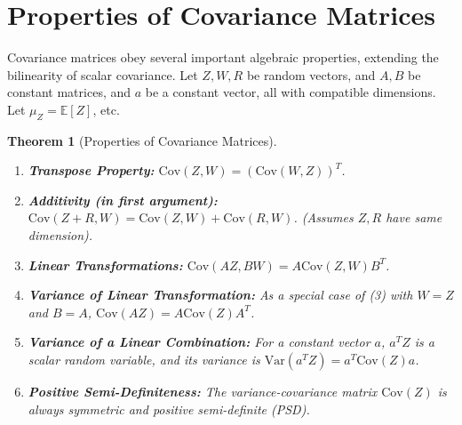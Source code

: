 \documentclass[11pt]{article}
\newtheorem{theorem}{Theorem}[section]
\theoremstyle{definition}
\newcommand{\E}{\mathbb{E}}
\newcommand{\Cov}{\mathrm{Cov}}
\newcommand{\Var}{\mathrm{Var}}
\begin{document}
\section{Properties of Covariance Matrices}

Covariance matrices obey several important algebraic properties, extending the bilinearity of scalar covariance. Let $Z, W, R$ be random vectors, and $A, B$ be constant matrices, and $a$ be a constant vector, all with compatible dimensions. Let $\mu_Z = \E[Z]$, etc.

\begin{theorem}[Properties of Covariance Matrices]
\begin{enumerate}
    \item \textbf{Transpose Property:} $\Cov(Z, W) = (\Cov(W, Z))^T$.
    \item \textbf{Additivity (in first argument):} $\Cov(Z + R, W) = \Cov(Z, W) + \Cov(R, W)$. (Assumes $Z, R$ have same dimension).
    \item \textbf{Linear Transformations:} $\Cov(A Z, B W) = A \Cov(Z, W) B^T$.
    \item \textbf{Variance of Linear Transformation:} As a special case of (3) with $W=Z$ and $B=A$, $\Cov(A Z) = A \Cov(Z) A^T$.
    \item \textbf{Variance of a Linear Combination:} For a constant vector $a$, $a^T Z$ is a scalar random variable, and its variance is $\Var(a^T Z) = a^T \Cov(Z) a$.
    \item \textbf{Positive Semi-Definiteness:} The variance-covariance matrix $\Cov(Z)$ is always symmetric and positive semi-definite (PSD).
\end{enumerate}
\end{theorem}
\end{document}

